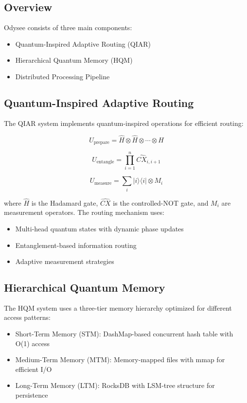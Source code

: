 \documentclass[10pt,twocolumn]{article}
\begin{document}
\subsection{Overview}
Odysee consists of three main components:
\begin{itemize}
    \item Quantum-Inspired Adaptive Routing (QIAR)
    \item Hierarchical Quantum Memory (HQM)
    \item Distributed Processing Pipeline
\end{itemize}

\subsection{Quantum-Inspired Adaptive Routing}
The QIAR system implements quantum-inspired operations for efficient routing:

\begin{equation}
    U_{\text{prepare}} = \hat{H} \otimes \hat{H} \otimes \cdots \otimes \hat{H}
\end{equation}

\begin{equation}
    U_{\text{entangle}} = \prod_{i=1}^n \hat{CX}_{i,i+1}
\end{equation}

\begin{equation}
    U_{\text{measure}} = \sum_i |i\rangle\langle i| \otimes M_i
\end{equation}

where $\hat{H}$ is the Hadamard gate, $\hat{CX}$ is the controlled-NOT gate, and $M_i$ are measurement operators. The routing mechanism uses:

\begin{itemize}
    \item Multi-head quantum states with dynamic phase updates
    \item Entanglement-based information routing
    \item Adaptive measurement strategies
\end{itemize}

\subsection{Hierarchical Quantum Memory}
The HQM system uses a three-tier memory hierarchy optimized for different access patterns:

\begin{itemize}
    \item Short-Term Memory (STM): DashMap-based concurrent hash table with O(1) access
    \item Medium-Term Memory (MTM): Memory-mapped files with mmap for efficient I/O
    \item Long-Term Memory (LTM): RocksDB with LSM-tree structure for persistence
\end{itemize}
\end{document}

